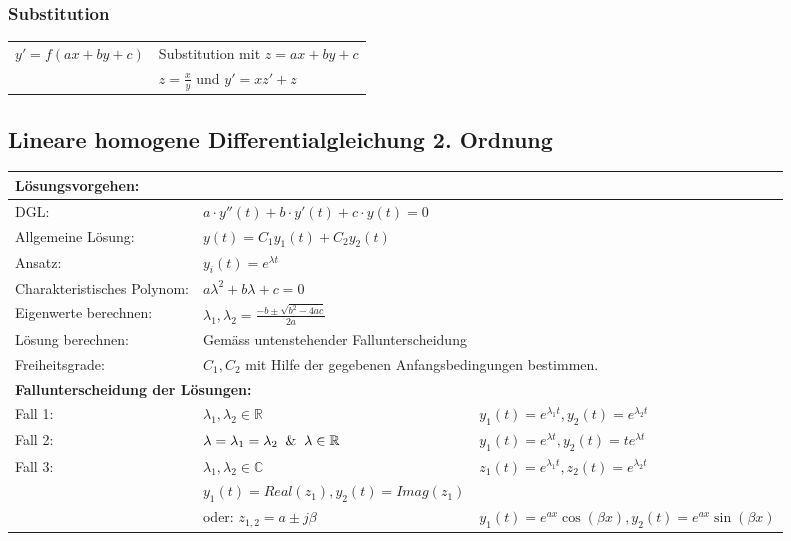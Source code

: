 \subsubsection{Substitution}
\begin{tabular}{p{4cm}p{6cm}}
	$y' = f(ax + by + c)$ & Substitution mit $z = ax + by + c$\\
	& $z = \frac{x}{y}$ und $y' = xz' + z$ \\
\end{tabular}

\subsection{Lineare homogene Differentialgleichung 2. Ordnung}
\begin{tabular}{p{}p{}p{}}
	\multicolumn{3}{l}{\textbf{Lösungsvorgehen:}}\\
	\hline
	DGL:                       		
		& $a \cdot y''(t) + b \cdot y'(t) + c \cdot y(t) = 0$
		&\\
	Allgemeine Lösung:
		& $y(t) = C_1y_1(t) + C_2y_2(t)$
		&\\
	Ansatz:                    		
		& $y_i(t) = e^{\lambda t}$
		&\\
	Charakteristisches Polynom:    	
		& $a\lambda^2 + b\lambda +c =0$
		&\\
	Eigenwerte berechnen:	 		
		& $\lambda_1,\lambda_2 = \frac{-b \pm \sqrt{b^2 - 4ac}}{2a}$
		&\\
	Lösung berechnen:	
		& \multicolumn{2}{l}{Gemäss untenstehender Fallunterscheidung}\\
	Freiheitsgrade:            		
		& \multicolumn{2}{l}{$C_1,C_2$ mit Hilfe der gegebenen Anfangsbedingungen bestimmen.}\\
	\multicolumn{3}{l}{\textbf{Fallunterscheidung der Lösungen:}}\\
	\hline
	Fall 1:                    		
		& $\lambda_1,\lambda_2 \in \mathbb{R}$
		& $y_1(t) = e^{\lambda_1 t}, y_2(t) = e^{\lambda_2 t}$\\
	Fall 2:                    		
		& $\lambda = \lambda_1 = \lambda_2 \And \lambda \in \mathbb{R}$
		& $y_1(t) = e^{\lambda t}, y_2(t) = te^{\lambda t}$\\
	Fall 3:                    		
		& $\lambda_1,\lambda_2 \in \mathbb{C}$
		& $z_1(t) = e^{\lambda_1 t}, z_2(t) = e^{\lambda_2 t}$\\
	    & $y_1(t) = Real(z_1), y_2(t) = Imag(z_1)$\\
	    & oder: $z_{1,2} = a \pm j\beta$
	    & $y_1(t) = e^{ax}\cos(\beta x), y_2(t) = e^{ax} \sin(\beta x)$\\
	\hline
\end{tabular}

